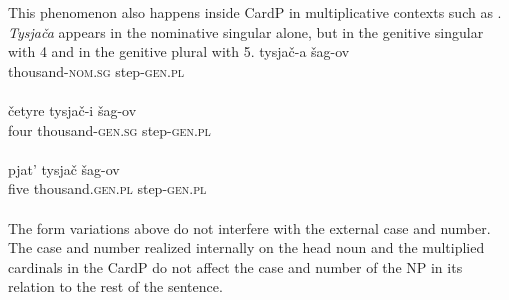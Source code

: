 \documentclass[output=paper]{langsci/langscibook}
\begin{document}
This phenomenon also happens inside CardP in multiplicative contexts such as . \emph{Tysja\v{c}a}  appears in the nominative singular alone, but in the genitive singular with 4 and in the genitive plural with 5.
\ea\label{caseMille}
	\ea\gll tysja\v{c}-a \v{s}ag-ov \\ thousand-\textsc{nom.sg} step-\textsc{gen.pl}\\ \\
	\ex\gll \v{c}etyre tysja\v{c}-i \v{s}ag-ov \\ four thousand-\textsc{gen.sg} step-\textsc{gen.pl}\\ \\
	\ex\gll pjat' tysja\v{c} \v{s}ag-ov \\ five thousand.\textsc{gen.pl} step-\textsc{gen.pl}\\ \\
	\z
\z
The form variations above do not interfere with the external case and number. The case and number realized internally on the head noun and the multiplied cardinals  in the CardP do not affect the case and number of the NP in its relation to the rest of the sentence.
\end{document}
